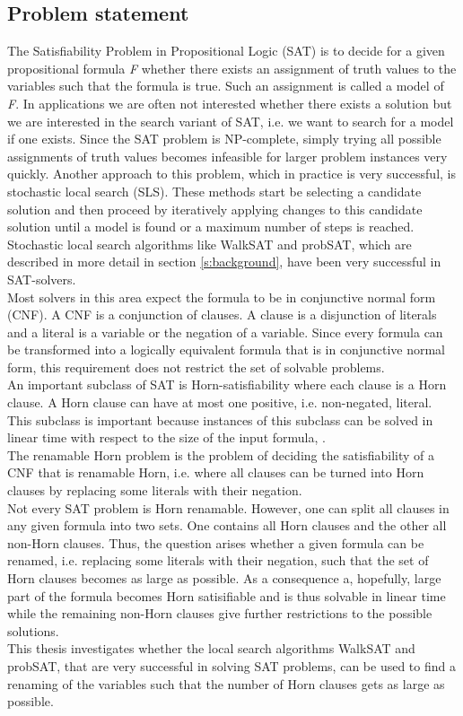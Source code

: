 \documentclass[12pt,a4paper]{article}
\begin{document}
\subsection{Problem statement}
The Satisfiability Problem in Propositional Logic (SAT) is to decide for a given propositional formula \textit{F} whether there exists an assignment of truth values to the variables such that the formula  is true. Such an assignment is called a model of \textit{F}. In applications we are often not interested whether there exists a solution but we are interested in the search variant of SAT, i.e. we want to search for a model if one exists. Since the SAT problem is NP-complete, simply trying all possible assignments of truth values becomes infeasible for larger problem instances very quickly. Another approach to this problem, which in practice is very successful, is stochastic local search (SLS). These methods start be selecting a candidate solution and then proceed by iteratively applying changes to this candidate solution until a model is found or a maximum number of steps is reached. Stochastic local search algorithms like WalkSAT and probSAT, which are described in more detail in section \ref{s:background},  have been very successful in SAT-solvers.\\

Most solvers in this area expect the formula to be in conjunctive normal form (CNF). A CNF is a conjunction of clauses. A clause is a disjunction of literals and a literal is a variable or the negation of a variable. Since every formula can be transformed into a logically equivalent formula that is in conjunctive normal form, this requirement does not restrict the set of solvable problems.\\

An important subclass of SAT is Horn-satisfiability where each clause is a Horn clause. A Horn clause can have at most one positive, i.e. non-negated, literal. This subclass is important because instances of this subclass can be solved in linear time with respect to the size of the input formula\cite{SLS}, \cite{DOWLING1984267}. \\
The renamable Horn problem is the problem of deciding the satisfiability of a CNF that is renamable Horn, i.e. where all clauses can be turned into Horn clauses by replacing some literals with their negation.\\

Not every SAT problem is Horn renamable. However, one can split all clauses in any given formula into two sets. One contains all Horn clauses and the other all non-Horn clauses. Thus, the question arises whether a given formula can be renamed, i.e. replacing some literals with their negation, such that the set of Horn clauses becomes as large as possible. As a consequence a, hopefully, large part of the formula becomes Horn satisifiable and is thus solvable in linear time while the remaining non-Horn clauses give further restrictions to the possible solutions.\\
This thesis investigates whether the local search algorithms WalkSAT and probSAT, that are very successful in solving SAT problems, can be used to find a renaming of the variables such that the number of Horn clauses gets as large as possible.
\end{document}
